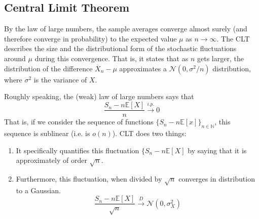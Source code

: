 \subsection{Central Limit Theorem}

  By the law of large numbers, the sample averages converge almost surely (and therefore converge in probability) to the expected value $\mu$ as $n \rightarrow \infty$. The CLT describes the size and the distributional form of the stochastic fluctuations around $\mu$ during this convergence. That is, it states that as $n$ gets larger, the distribution of the difference $\overline{X}_n - \mu$ approximates a $\mathcal{N}(0, \sigma^2 / n)$ distribution, where $\sigma^2$ is the variance of $X$. 


  Roughly speaking, the (weak) law of large numbers says that 
  \begin{equation}
    \frac{S_n - n \mathbb{E}[X]}{n} \xrightarrow{i.p.} 0
  \end{equation}
  That is, if we consider the sequence of functions $\{S_n - n \mathbb{E}[x]\}_{n \in \mathbb{N}}$, this sequence is sublinear (i.e. is $o(n)$). CLT does two things: 
  \begin{enumerate}
    \item It specifically quantifies this fluctuation $\{S_n - n \mathbb{E}[X]$ by saying that it is approximately of order $\sqrt{n}$. 
    \item Furthermore, this fluctuation, when divided by $\sqrt{n}$ converges in distribution to a Gaussian. 
    \begin{equation}
      \frac{S_n - n \mathbb{E}[X]}{\sqrt{n}} \xrightarrow{D} \mathcal{N}(0, \sigma_X^2)
    \end{equation}
  \end{enumerate}

